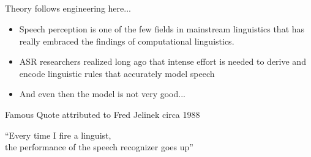 \documentclass[9pt,xcolor=pdftex,dvipsnames,table]{beamer}
\begin{document}
\subsection{}
\begin{frame}{Theory follows engineering here...}

\begin{itemize}
	\item Speech perception is one of the few fields in mainstream linguistics that has really embraced the findings of computational linguistics.
	
	\item ASR researchers realized long ago that intense effort is needed to derive and encode linguistic rules that accurately model speech
	\item And even then the model is not very good...
\end{itemize}

\begin{block}{Famous Quote attributed to Fred Jelinek circa 1988}
\vspace{.25cm}
 \begin{flushright}
{\Huge``Every time I fire a linguist,}\\{\LARGE the performance of the speech recognizer goes up''}
 \end{flushright}
 \vspace{.25cm}
\end{block}
\end{frame}
\end{document}
